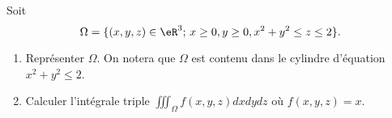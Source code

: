 
\begin{exercice}\label{exoOutilsMath-0150}

Soit 
\begin{equation}
    \Omega=\{ (x,y,z)\in \eR^3;\,x\geq 0,y\geq 0,x^2+y^2\leq z\leq 2 \}.
\end{equation}
\begin{enumerate}
    \item
        Représenter \( \Omega\). On notera que \( \Omega\) est contenu dans le cylindre d'équation \( x^2+y^2\leq 2\).
    \item
        Calculer l'intégrale triple \( \iiint_{\Omega}f(x,y,z)dxdydz\) où \( f(x,y,z)=x\).
\end{enumerate}

\end{exercice}
